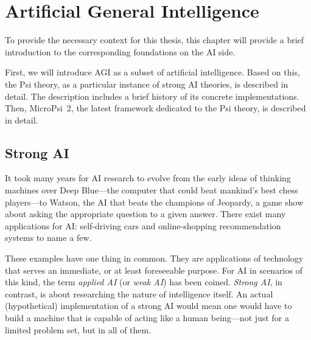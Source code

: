 


\chapter{Artificial General Intelligence}
\label{chap:2}
To provide the necessary context for this thesis, this chapter will provide a brief introduction to the corresponding foundations on the AI side.


First, we will introduce AGI as a subset of artificial intelligence. Based on this, the Psi theory, as a particular instance of strong AI theories, is described in detail. The description includes a brief history of its concrete implementations. Then, MicroPsi~2, the latest framework dedicated to the Psi theory, is described in detail.

    \section{Strong AI}
    
    
It took many years for AI research to evolve from the early ideas of thinking machines over Deep Blue---the computer that could beat mankind's best chess players---to Watson, the AI that beats the champions of Jeopardy, a game show about asking the appropriate question to a given answer. There exist many applications for AI: self-driving cars and online-shopping recommendation systems to name a few.


These examples have one thing in common. They are applications of technology that serves an immediate, or at least foreseeable purpose. For AI in scenarios of this kind, the term \emph{applied AI} (or \emph{weak AI}) has been coined. \emph{Strong AI}, in contrast, is about researching the nature of intelligence itself. An actual (hypothetical) implementation of a strong AI would mean one would have to build a machine that is capable of acting like a human being---not just for a limited problem set, but in all of them. 

